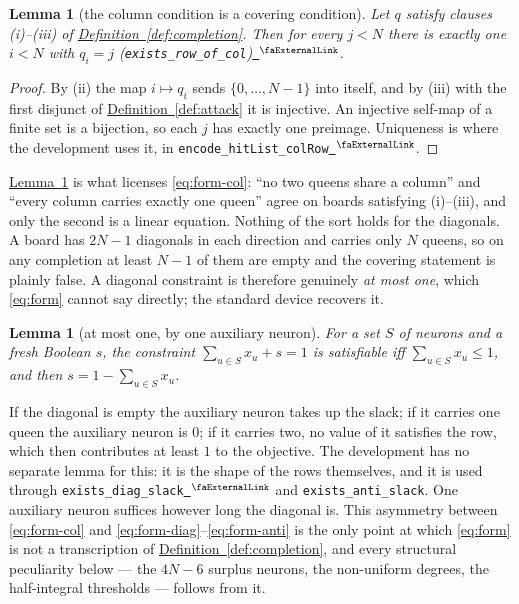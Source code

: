 \documentclass{easychair}
\newtheorem{lemma}[thm]{Lemma}
\newcommand{\lemref}[1]{\textcolor{academicpurple}{\hyperref[#1]{Lemma~\ref*{#1}}}}
\newcommand{\defref}[1]{\textcolor{academicpurple}{\hyperref[#1]{Definition~\ref*{#1}}}}
\newcommand{\extlink}{~\ensuremath{{}^\text{\faExternalLink}}}
\newcommand{\repoowner}{mkaratarakis/HNBM}
\newcommand{\reporef}{1bd91612ee31180f6c99fa11090b713f3012ead4}
\newcommand{\repo}{https://github.com/\repoowner/blob/\reporef}
\newcommand{\srcl}[2]{\href{\repo/#1\#L#2}{\extlink}}
\newcommand{\qsrc}[2]{\srcl{HopfieldNet/QUBO/Instances/Queens/#1}{#2}}
\begin{document}
\begin{lemma}[the column condition is a covering condition]\label{lem:pigeon}
Let $q$ satisfy clauses (i)--(iii) of \defref{def:completion}. Then for every $j < N$ there is
exactly one $i < N$ with $q_i = j$ (\lstinline{exists_row_of_col})\qsrc{Basic.lean}{991}.
\end{lemma}

\begin{proof}
By (ii) the map $i \mapsto q_i$ sends $\{0,\dots,N-1\}$ into itself, and by (iii) with the first
disjunct of \defref{def:attack} it is injective. An injective self-map of a finite set is a
bijection, so each $j$ has exactly one preimage. Uniqueness is where the development uses it, in
\lstinline{encode_hitList_colRow}\qsrc{Basic.lean}{1045}.
\end{proof}

\lemref{lem:pigeon} is what licenses \eqref{eq:form-col}: \enquote{no two queens share a column} and
\enquote{every column carries exactly one queen} agree on boards satisfying (i)--(iii), and only the
second is a linear equation. Nothing of the sort holds for the diagonals. A board has $2N-1$
diagonals in each direction and carries only $N$ queens, so on any completion at least $N-1$ of them
are empty and the covering statement is plainly false. A diagonal constraint is therefore genuinely
\emph{at most one}, which \eqref{eq:form} cannot say directly; the standard device recovers it.

\begin{lemma}[at most one, by one auxiliary neuron]\label{lem:slack}
For a set $S$ of neurons and a fresh Boolean $s$, the constraint $\sum_{u \in S}x_u + s = 1$ is
satisfiable iff $\sum_{u \in S}x_u \le 1$, and then $s = 1 - \sum_{u \in S}x_u$.
\end{lemma}

If the diagonal is empty the auxiliary neuron takes up the slack; if it carries one queen the
auxiliary neuron is $0$; if it carries two, no value of it satisfies the row, which then contributes
at least $1$ to the objective. The development has no separate lemma for this: it is the shape of
the rows themselves, and it is used through
\lstinline{exists_diag_slack}\qsrc{Basic.lean}{268} and \lstinline{exists_anti_slack}. One auxiliary neuron suffices however long the diagonal is. This
asymmetry between \eqref{eq:form-col} and \eqref{eq:form-diag}--\eqref{eq:form-anti} is the only
point at which
\eqref{eq:form} is not a transcription of \defref{def:completion}, and every structural peculiarity
below --- the $4N-6$ surplus neurons, the non-uniform degrees, the half-integral thresholds ---
follows from it.
\end{document}
